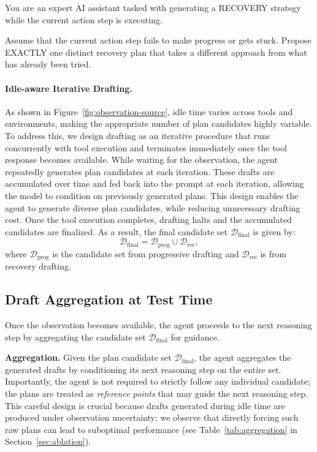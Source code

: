 \begin{tcolorbox}[title=Recovery Drafting Prompt, fontupper=\small, width=\linewidth]
You are an expert AI assistant tasked with generating a RECOVERY strategy while the current action step is executing.

Assume that the current action step fails to make progress or gets stuck.
Propose EXACTLY one distinct recovery plan that takes a different approach from what has already been tried.
\end{tcolorbox}


\paragraph{Idle-aware Iterative Drafting.}
As shown in Figure~\ref{fig:observation-source}, idle time varies across tools and environments,
making the appropriate number of plan candidates highly variable.
To address this, we design drafting as an iterative procedure that runs concurrently with tool execution and terminates immediately once the tool response becomes available.
While waiting for the observation, the agent repeatedly generates plan candidates at each iteration.
These drafts are accumulated over time and fed back into the prompt at each iteration, allowing the model to condition on previously generated plans.
This design enables the agent to generate diverse plan candidates, while reducing unnecessary drafting cost. Once the tool execution completes, drafting halts and the accumulated candidates are finalized.
As a result, the final candidate set $\mathcal{D}_\text{final}$ is given by:
\begin{equation}
\mathcal{D}_\text{final} = \mathcal{D}_\text{prog} \cup \mathcal{D}_\text{rec}, 
\end{equation}
where $\mathcal{D}_\text{prog}$ is the candidate set from progressive drafting and $\mathcal{D}_\text{rec}$ is from recovery drafting. 


\subsection{Draft Aggregation at Test Time}
\label{subsec:verification}

Once the observation becomes available, the agent proceeds to the next reasoning step by aggregating the candidate set $\mathcal{D}_\text{final}$ for guidance.

\textbf{Aggregation.}
Given the plan candidate set $\mathcal{D}_\text{final}$, the agent aggregates the generated drafts by conditioning its next reasoning step on the entire set. 
Importantly, the agent is not required to strictly follow any individual candidate; the plans are treated as \textit{reference points} that may guide the next reasoning step. 
This careful design is crucial because drafts generated during idle time are produced under observation uncertainty; we observe that directly forcing such raw plans can lead to suboptimal performance (see Table~\ref{tab:aggregation} in Section~\ref{sec:ablation}).

